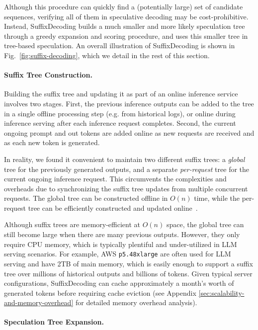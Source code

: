 Although this procedure can quickly find a (potentially large) set of candidate sequences, verifying all of them in speculative decoding may be cost-prohibitive. Instead, SuffixDecoding builds a much smaller and more likely speculation tree through a greedy expansion and scoring procedure, and uses this smaller tree in tree-based speculation. An overall illustration of SuffixDecoding is shown in Fig.~\ref{fig:suffix-decoding}, which we detail in the rest of this section.

\paragraph{Suffix Tree Construction.}

Building the suffix tree and updating it as part of an online inference service involves two stages. First, the previous inference outputs can be added to the tree in a single offline processing step (e.g. from historical logs), or online during inference serving after each inference request completes. Second, the current ongoing prompt and out tokens are added online as new requests are received and as each new token is generated.

In reality, we found it convenient to maintain two different suffix trees: a \emph{global} tree for the previously generated outputs, and a separate \emph{per-request} tree for the current ongoing inference request. This circumvents the complexities and overheads due to synchronizing the suffix tree updates from multiple concurrent requests. The global tree can be constructed offline in \( O(n) \) time, while the per-request tree can be efficiently constructed and updated online~\citep{10.1007/BF01206331}.

Although suffix trees are memory-efficient at \( O(n) \) space, the global tree can still become large when there are many previous outputs. However, they only require CPU memory, which is typically plentiful and under-utilized in LLM serving scenarios. For example, AWS \texttt{p5.48xlarge} are often used for LLM serving and have 2TB of main memory, which is easily enough to support a suffix tree over millions of historical outputs and billions of tokens. Given typical server configurations, SuffixDecoding can cache approximately a month's worth of generated tokens before requiring cache eviction (see Appendix \ref{sec:scalability-and-memory-overhead} for detailed memory overhead analysis).

\paragraph{Speculation Tree Expansion.}


